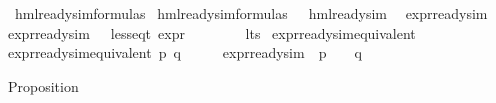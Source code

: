 \begin{isabellebody}
\isanewline
{}\isamarkupfalse%
\ hml{\isacharunderscore}{\kern0pt}ready{\isacharunderscore}{\kern0pt}sim{\isacharunderscore}{\kern0pt}formulas\ \isanewline
{\isachardoublequoteopen}hml{\isacharunderscore}{\kern0pt}ready{\isacharunderscore}{\kern0pt}sim{\isacharunderscore}{\kern0pt}formulas\ {\isasymequiv}\ {\isacharbraceleft}{\kern0pt}{\isasymphi}{\isachardot}{\kern0pt}\ hml{\isacharunderscore}{\kern0pt}ready{\isacharunderscore}{\kern0pt}sim\ {\isasymphi}{\isacharbraceright}{\kern0pt}{\isachardoublequoteclose}\isanewline
\isanewline
{}\isamarkupfalse%
\ expr{\isacharunderscore}{\kern0pt}ready{\isacharunderscore}{\kern0pt}sim\isanewline
\ \ \isanewline
{\isachardoublequoteopen}expr{\isacharunderscore}{\kern0pt}ready{\isacharunderscore}{\kern0pt}sim\ {\isacharequal}{\kern0pt}\ {\isacharbraceleft}{\kern0pt}{\isasymphi}{\isachardot}{\kern0pt}\ {\isacharparenleft}{\kern0pt}less{\isacharunderscore}{\kern0pt}eq{\isacharunderscore}{\kern0pt}t\ {\isacharparenleft}{\kern0pt}expr\ {\isasymphi}{\isacharparenright}{\kern0pt}\ {\isacharparenleft}{\kern0pt}{\isasyminfinity}{\isacharcomma}{\kern0pt}\ {\isasyminfinity}{\isacharcomma}{\kern0pt}\ {\isasyminfinity}{\isacharcomma}{\kern0pt}\ {\isasyminfinity}{\isacharcomma}{\kern0pt}\ {}{\isacharcomma}{\kern0pt}\ {}{\isacharparenright}{\kern0pt}{\isacharparenright}{\kern0pt}{\isacharbraceright}{\kern0pt}{\isachardoublequoteclose}\isanewline
\isanewline
{}\isamarkupfalse%
\ lts\isanewline
{}\isanewline
\isanewline
{}\isamarkupfalse%
\ expr{\isacharunderscore}{\kern0pt}ready{\isacharunderscore}{\kern0pt}sim{\isacharunderscore}{\kern0pt}equivalent\ \isanewline
\ \ \isanewline
{\isachardoublequoteopen}expr{\isacharunderscore}{\kern0pt}ready{\isacharunderscore}{\kern0pt}sim{\isacharunderscore}{\kern0pt}equivalent\ p\ q\ {\isasymequiv}\ {\isacharparenleft}{\kern0pt}{\isasymforall}\ {\isasymphi}{\isachardot}{\kern0pt}\ {\isasymphi}\ {\isasymin}\ expr{\isacharunderscore}{\kern0pt}ready{\isacharunderscore}{\kern0pt}sim\ {\isasymlongrightarrow}\ {\isacharparenleft}{\kern0pt}p\ {\isasymTurnstile}\ {\isasymphi}{\isacharparenright}{\kern0pt}\ {\isasymlongleftrightarrow}\ {\isacharparenleft}{\kern0pt}q\ {\isasymTurnstile}\ {\isasymphi}{\isacharparenright}{\kern0pt}{\isacharparenright}{\kern0pt}{\isachardoublequoteclose}\isanewline
{}\isamarkupfalse%
%
\begin{isamarkuptext}%
Proposition%
\end{isamarkuptext}\isamarkuptrue%

\end{isabellebody}

